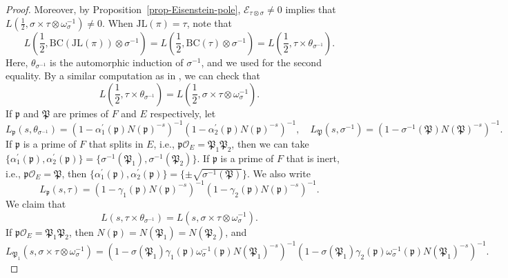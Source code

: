 \documentclass[12pt]{amsart}
\newcommand{\JL}{\mathrm{JL}}
\newcommand{\BC}{\mathrm{BC}}
\newcommand{\CE}{{\mathcal{E}}}
\theoremstyle{remark}
\begin{document}
\begin{proof}
Moreover, by Proposition~\ref{prop-Eisenstein-pole}, $\CE_{\tau\otimes\sigma}\not=0$ implies that $L(\frac{1}{2},\sigma\times\tau\otimes\omega_\sigma^{-1})\not=0$.
When $\JL(\pi)=\tau$, note that 
\begin{equation*}
	L(\frac{1}{2}, \BC(\JL(\pi))\otimes\sigma^{-1})=L(\frac{1}{2}, \BC(\tau)\otimes\sigma^{-1})=L(\frac{1}{2}, \tau\times \theta_{\sigma^{-1}}).
\end{equation*}
Here, $\theta_{\sigma^{-1}}$ is the automorphic induction of $\sigma^{-1}$, and we used \cite[page 102]{Bump1997book} for the second equality. 
By a similar computation as in \cite[pages 102-103]{Bump1997book}, we can check that 
\begin{equation}
\label{eq-JL-L-identity}
L(\frac{1}{2}, \tau\times \theta_{\sigma^{-1}})=L(\frac{1}{2}, \sigma\times\tau\otimes\omega_{\sigma}^{-1}).	
\end{equation}
\iffalse
If $\mathfrak{p}$ and $\mathfrak{P}$ are primes of $F$ and $E$ respectively, let
\begin{equation*}
L_\mathfrak{p}(s,\theta_{\sigma^{-1}})=(1-\alpha_1^\prime(\mathfrak{p}) N(\mathfrak{p})^{-s})^{-1}(1-\alpha_2^\prime(\mathfrak{p}) N(\mathfrak{p})^{-s})^{-1}, \quad L_\mathfrak{P}(s, \sigma^{-1})=(1-\sigma^{-1}(\mathfrak{P})N(\mathfrak{P})^{-s})^{-1}.	
\end{equation*}
If $\mathfrak{p}$ is a prime of $F$ that splits in $E$, i.e., $\mathfrak{p}\mathcal{O}_E=\mathfrak{P}_1 \mathfrak{P}_2$, then we can take $\{\alpha_1^\prime(\mathfrak{p}), \alpha_2^\prime(\mathfrak{p})\}=\{ \sigma^{-1}(\mathfrak{P}_1),  \sigma^{-1}(\mathfrak{P}_2)\}$. If $\mathfrak{p}$ is a prime of $F$ that is inert, i.e., $\mathfrak{p}\mathcal{O}_E=\mathfrak{P}$, then $\{\alpha_1^\prime(\mathfrak{p}), \alpha_2^\prime(\mathfrak{p})\}=\{ \pm \sqrt{\sigma^{-1}(\mathfrak{P})}\}$.
We also write
\begin{equation*}
L_\mathfrak{p}(s, \tau)= (1-\gamma_1(\mathfrak{p}) N(\mathfrak{p})^{-s})^{-1}(1-\gamma_2(\mathfrak{p}) N(\mathfrak{p})^{-s})^{-1}	.
\end{equation*}
We claim that 
\begin{equation}
\label{eq-JL-L-functions-identity}
L(s, \tau\times \theta_{\sigma^{-1}})=L(s, \sigma\times\tau\otimes\omega_{\sigma}^{-1}).	
\end{equation}
If $\mathfrak{p}\mathcal{O}_E=\mathfrak{P}_1 \mathfrak{P}_2$, then $N(\mathfrak{p})=N(\mathfrak{P}_1)=N(\mathfrak{P}_2)$, and 
\begin{equation*}
L_{\mathfrak{P}_1}(s, \sigma\times \tau\otimes\omega_\sigma^{-1})=	(1-\sigma(\mathfrak{P}_1) \gamma_1(\mathfrak{p}) \omega_{\sigma}^{-1}(\mathfrak{p}) N(\mathfrak{P}_1)^{-s})^{-1} (1-\sigma(\mathfrak{P}_1) \gamma_2(\mathfrak{p}) \omega_{\sigma}^{-1}(\mathfrak{p}) N(\mathfrak{P}_1)^{-s})^{-1}.

\end{equation*}
\end{proof}
\end{document}
